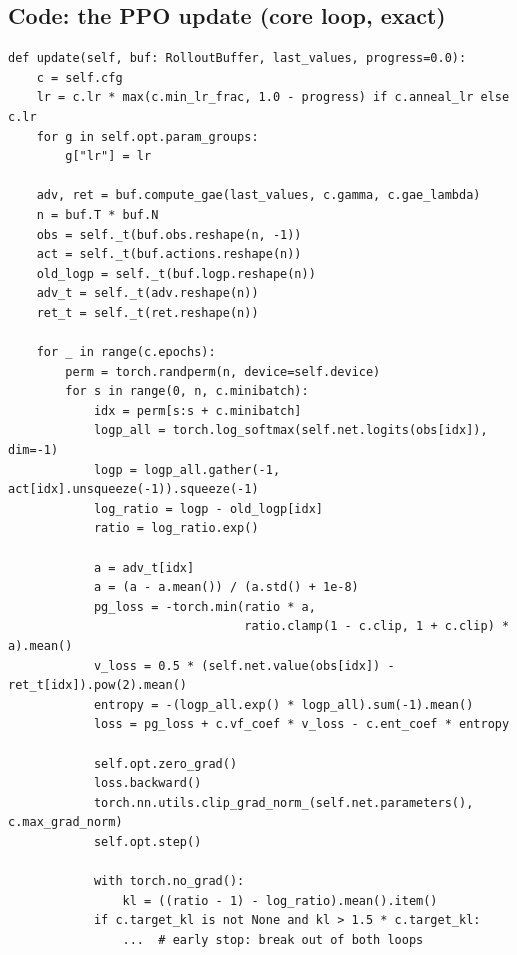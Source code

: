 \documentclass[11pt,a4paper]{article}
\newcommand{\code}[1]{\texttt{#1}}
\begin{document}
\subsection{Code: the PPO update (core loop, exact)}
\begin{lstlisting}[title={\code{rl/ppo.py} -- PPO.update (statistics bookkeeping omitted)}]
def update(self, buf: RolloutBuffer, last_values, progress=0.0):
    c = self.cfg
    lr = c.lr * max(c.min_lr_frac, 1.0 - progress) if c.anneal_lr else c.lr
    for g in self.opt.param_groups:
        g["lr"] = lr

    adv, ret = buf.compute_gae(last_values, c.gamma, c.gae_lambda)
    n = buf.T * buf.N
    obs = self._t(buf.obs.reshape(n, -1))
    act = self._t(buf.actions.reshape(n))
    old_logp = self._t(buf.logp.reshape(n))
    adv_t = self._t(adv.reshape(n))
    ret_t = self._t(ret.reshape(n))

    for _ in range(c.epochs):
        perm = torch.randperm(n, device=self.device)
        for s in range(0, n, c.minibatch):
            idx = perm[s:s + c.minibatch]
            logp_all = torch.log_softmax(self.net.logits(obs[idx]), dim=-1)
            logp = logp_all.gather(-1, act[idx].unsqueeze(-1)).squeeze(-1)
            log_ratio = logp - old_logp[idx]
            ratio = log_ratio.exp()

            a = adv_t[idx]
            a = (a - a.mean()) / (a.std() + 1e-8)
            pg_loss = -torch.min(ratio * a,
                                 ratio.clamp(1 - c.clip, 1 + c.clip) * a).mean()
            v_loss = 0.5 * (self.net.value(obs[idx]) - ret_t[idx]).pow(2).mean()
            entropy = -(logp_all.exp() * logp_all).sum(-1).mean()
            loss = pg_loss + c.vf_coef * v_loss - c.ent_coef * entropy

            self.opt.zero_grad()
            loss.backward()
            torch.nn.utils.clip_grad_norm_(self.net.parameters(), c.max_grad_norm)
            self.opt.step()

            with torch.no_grad():
                kl = ((ratio - 1) - log_ratio).mean().item()
            if c.target_kl is not None and kl > 1.5 * c.target_kl:
                ...  # early stop: break out of both loops
\end{lstlisting}
\end{document}
